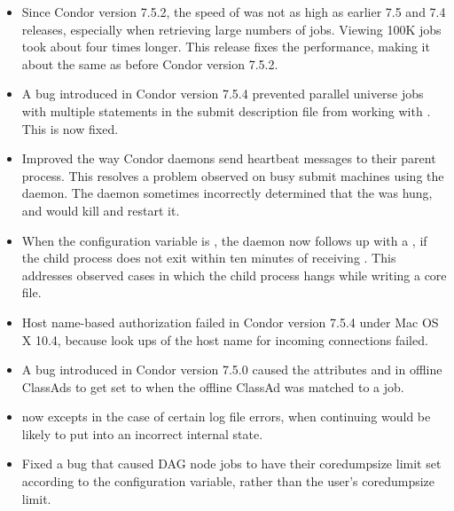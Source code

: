 \begin{itemize}

\item Since Condor version 7.5.2, the speed of  was not as high
  as earlier 7.5 and 7.4 releases,
  especially when retrieving large numbers of jobs.
  Viewing 100K jobs took about four times longer.
  This release fixes the performance,
  making it about the same as before Condor version 7.5.2.

\item A bug introduced in Condor version 7.5.4 prevented parallel 
universe jobs with multiple  statements in 
the submit description file from working with .
This is now fixed.

\item Improved the way Condor daemons send heartbeat messages to their parent
process.  This resolves a problem observed on busy submit machines using the
 daemon.  The  daemon sometimes incorrectly
determined that the  was hung, and would kill and restart it.

\item When the configuration variable 
is ,
the  daemon now follows up with a ,
if the child process does not exit within ten minutes of receiving
.
This addresses observed cases in
which the child process hangs while writing a core file.

\item Host name-based authorization failed in Condor version 7.5.4
under Mac OS X 10.4,
because look ups of the host name for incoming connections failed.

\item A bug introduced in Condor version 7.5.0 caused
the attributes  and 
in offline ClassAds to get set to 
when the offline ClassAd was matched to a job.

\item {} now excepts in the case of certain log file errors,
when continuing would be likely to put  into an incorrect 
internal state.

\item Fixed a bug that caused DAG node jobs to have their coredumpsize
limit set according to the  configuration
variable, rather than the user's coredumpsize limit.


\end{itemize}
